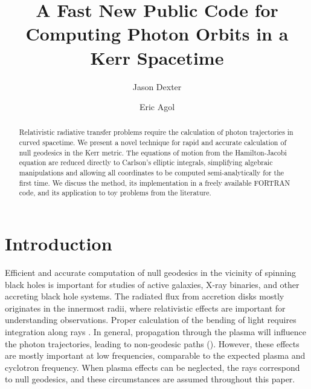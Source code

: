 \documentclass[apj]{emulateapj}
\begin{document}
\title{A Fast New Public Code for Computing Photon Orbits in a Kerr Spacetime}
\author{Jason Dexter}
\author{Eric Agol}
\begin{abstract}
Relativistic radiative transfer problems require the calculation of photon trajectories in curved spacetime. We present a novel technique for rapid and accurate calculation of null geodesics in the Kerr metric. The equations of motion from the Hamilton-Jacobi equation are reduced directly to Carlson's elliptic integrals, simplifying algebraic manipulations and allowing all coordinates to be computed semi-analytically for the first time. We discuss the method, its implementation in a freely available FORTRAN code, and its application to toy problems from the literature.
\end{abstract}
\maketitle

\section{Introduction}

Efficient and accurate computation of null geodesics in the vicinity of spinning black holes is important for studies of active galaxies, X-ray binaries, and other accreting black hole systems. The radiated flux from accretion disks mostly originates in the innermost radii, where relativistic effects are important for understanding observations. Proper calculation of the bending of light requires integration along rays \citep{broderick2006}. In general, propagation through the plasma will influence the photon trajectories, leading to non-geodesic paths (\citealt{broderickblandford2003,broderickblandford2004}). However, these effects are mostly important at low frequencies, comparable to the expected plasma and cyclotron frequency. When plasma effects can be neglected, the rays correspond to null geodesics, and these circumstances are assumed throughout this paper.
\end{document}
